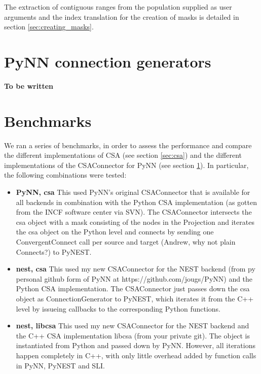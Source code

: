 \documentclass{frontiersSCNS} %
\newcommand{\tbw}[1]{{\bf\parindent0pt\color{red}#1}}
\begin{document}
The extraction of contiguous ranges from the population supplied as
user arguments and the index translation for the creation of masks is
detailed in section \ref{sec:creating_masks}.


\section{PyNN connection generators}\label{sec:conn_gen_pynn}
\tbw{To be written}


\section{Benchmarks}\label{sec:benchmarks}

We ran a series of benchmarks, in order to assess the performance and
compare the different implementations of CSA (see section
\ref{sec:csa}) and the different implementations of the CSAConnector
for PyNN (see section \ref{sec:conn_gen_pynn}). In particular, the
following combinations were tested:

\begin{itemize}
\item \textbf{PyNN, csa} This used PyNN's original CSAConnector that
  is available for all backends in combination with the Python CSA
  implementation (as gotten from the INCF software center via SVN).
  The CSAConnector intersects the csa object with a mask consisting of
  the nodes in the Projection and iterates the csa object on the
  Python level and connects by sending one ConvergentConnect call per
  source and target (Andrew, why not plain Connects?) to PyNEST.
\item \textbf{nest, csa} This used my new CSAConnector for the NEST
  backend (from py personal github form of PyNN at
  https://github.com/jougs/PyNN) and the Python CSA
  implementation. The CSAConnector just passes down the csa object as
  ConnectionGenerator to PyNEST, which iterates it from the C++ level
  by issueing callbacks to the corresponding Python functions.
\item \textbf{nest, libcsa} This used my new CSAConnector for the NEST
  backend and the C++ CSA implementation libcsa (from your private
  git). The object is instantiated from Python and passed down by
  PyNN. However, all iterations happen completely in C++, with only
  little overhead added by function calls in PyNN, PyNEST and SLI.
\end{itemize}
\end{document}
